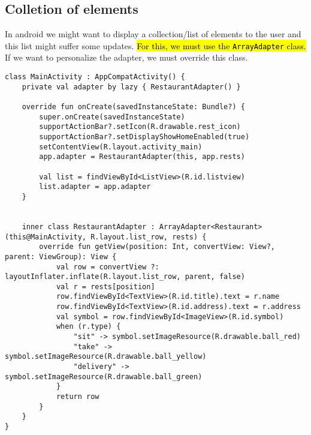 \subsection{Colletion of elements}
In android we might want to display a collection/list of elements to the user and this 
list might suffer some updates.  
\hl{For this, we must use the \texttt{ArrayAdapter} class.}
If we want to personalize the adapter, we must override this class. 

\begin{lstlisting}[title=ArrayAdapter Class Implementation]
class MainActivity : AppCompatActivity() {
    private val adapter by lazy { RestaurantAdapter() }
    
    override fun onCreate(savedInstanceState: Bundle?) {
        super.onCreate(savedInstanceState)
        supportActionBar?.setIcon(R.drawable.rest_icon)
        supportActionBar?.setDisplayShowHomeEnabled(true)
        setContentView(R.layout.activity_main)
        app.adapter = RestaurantAdapter(this, app.rests)
    
        val list = findViewById<ListView>(R.id.listview)
        list.adapter = app.adapter
    } 

    
    inner class RestaurantAdapter : ArrayAdapter<Restaurant>(this@MainActivity, R.layout.list_row, rests) {
        override fun getView(position: Int, convertView: View?, parent: ViewGroup): View {
            val row = convertView ?: layoutInflater.inflate(R.layout.list_row, parent, false)
            val r = rests[position]
            row.findViewById<TextView>(R.id.title).text = r.name
            row.findViewById<TextView>(R.id.address).text = r.address
            val symbol = row.findViewById<ImageView>(R.id.symbol)
            when (r.type) {
                "sit" -> symbol.setImageResource(R.drawable.ball_red)
                "take" -> symbol.setImageResource(R.drawable.ball_yellow)
                "delivery" -> symbol.setImageResource(R.drawable.ball_green)
            }
            return row
        }
    }
}
\end{lstlisting}
